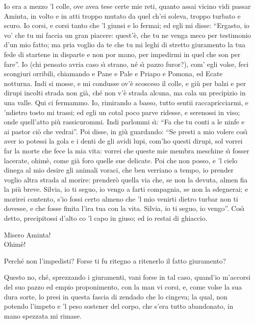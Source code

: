 \documentclass{book}
\begin{document}
	 Io era a mezzo 'l colle, ove avea tese
	certe mie reti, quanto assai vicino
	vidi passar Aminta, in volto e in atti
	troppo mutato da quel ch'ei soleva,
	troppo turbato e scuro. Io corsi, e corsi
	tanto che 'l giunsi e lo fermai; ed egli
	mi disse: ``Ergasto, io vo' che tu mi faccia
	un gran piacere: quest'\`e, che tu ne venga
	meco per testimonio d'un mio fatto;
	ma pria voglio da te che tu mi leghi
	di stretto giuramento la tua fede
	di startene in disparte e non por mano,
	per impedirmi in quel che son per fare''.
	Io (chi pensato avria caso s\`{\i} strano,
	n\'e s\`{\i} pazzo furor?), com' egli volse,
	feci scongiuri orribili, chiamando
	e Pane e Pale e Priapo e Pomona,
	ed Ecate notturna. Indi si mosse,
	e mi condusse ov'\`e scosceso il colle,
	e gi\`u per balzi e per dirupi incolti
	strada non gi\`a, ch\'e non v'\`e strada alcuna,
	ma cala un precipizio in una valle.
	Qui ci fermammo. Io, rimirando a basso,
	tutto sentii raccapricciarmi, e 'ndietro
	tosto mi trassi; ed egli un cotal poco
	parve ridesse, e serenossi in viso;
	onde quell'atto pi\`u rassicurommi.
	Indi parlommi s\`{\i}: ``Fa che tu conti
	a le ninfe e ai pastor ci\`o che vedrai''.
	Poi disse, in gi\`u guardando:
	``Se presti a mio volere
	cos\`{\i} aver io potessi
	la gola e i denti de gli avidi lupi,
	com'ho questi dirupi,
	sol vorrei far la morte
	che fece la mia vita:
	vorrei che queste mie membra meschine
	s\`{\i} fosser lacerate,
	ohim\`e, come gi\`a foro
	quelle sue delicate.
	Poi che non posso, e 'l cielo
	dinega al mio desire
	gli animali voraci,
	che ben verriano a tempo, io prender voglio
	altra strada al morire:
	prender\`o quella via
	che, se non la devuta,
	almen fia la pi\`u breve.
	Silvia, io ti seguo, io vengo
	a farti compagnia,
	se non la sdegnerai;
	e morirei contento,
	s'io fossi certo almeno
	che 'l mio venirti dietro
	turbar non ti dovesse,
	e che fosse finita
	l'ira tua con la vita.
	Silvia, io ti seguo, io vengo''. Cos\`{\i} detto,
	precipitossi d'alto
	co 'l capo in giuso; ed io restai di ghiaccio.

	\2 Misero Aminta! \\

   \3 Ohim\`e!

	\9 Perch\'e non l'impedisti?
	Forse ti fu ritegno a ritenerlo
	il fatto giuramento?

	 Questo no, ch\'e, sprezzando i giuramenti,
	vani forse in tal caso,
	quand'io m'accorsi del suo pazzo ed empio
	proponimento, con la man vi corsi,
	e, come volse la sua dura sorte,
	lo presi in questa fascia di zendado
	che lo cingeva; la qual, non potendo
	l'impeto e 'l peso sostener del corpo,
	che s'era tutto abandonato, in mano
	spezzata mi rimase. \\
\end{document}
